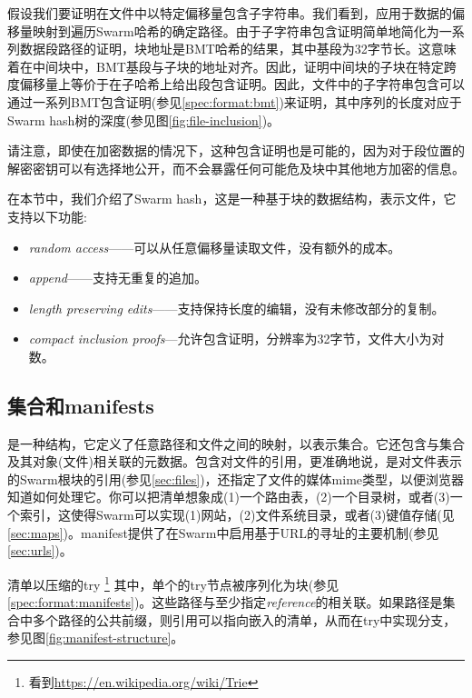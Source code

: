 假设我们要证明在文件中以特定偏移量包含子字符串。我们看到，应用于数据的偏移量映射到遍历Swarm哈希的确定路径。由于子字符串包含证明简单地简化为一系列数据段路径的证明，块地址是BMT哈希的结果，其中基段为32字节长。这意味着在中间块中，BMT基段与子块的地址对齐。因此，证明中间块的子块在特定跨度偏移量上等价于在子哈希上给出段包含证明。因此，文件中的子字符串包含可以通过一系列BMT包含证明(参见\ref{spec:format:bmt})来证明，其中序列的长度对应于Swarm hash树的深度(参见图\ref{fig:file-inclusion})。


请注意，即使在加密数据的情况下，这种包含证明也是可能的，因为对于段位置的解密密钥可以有选择地公开，而不会暴露任何可能危及块中其他地方加密的信息。

在本节中，我们介绍了Swarm hash，这是一种基于块的数据结构，表示文件，它支持以下功能:

\begin{itemize}
    \item \emph{random access}——可以从任意偏移量读取文件，没有额外的成本。
    \item \emph{append}——支持无重复的追加。 
    \item \emph{length preserving edits}——支持保持长度的编辑，没有未修改部分的复制。
    \item \emph{compact inclusion proofs}—允许包含证明，分辨率为32字节，文件大小为对数。
\end{itemize}



\subsection{集合和manifests\statusgreen}\label{sec:collections}

是一种结构，它定义了任意路径和文件之间的映射，以表示集合。它还包含与集合及其对象(文件)相关联的元数据。包含对文件的引用，更准确地说，是对文件表示的Swarm根块的引用(参见\ref{sec:files})，还指定了文件的媒体mime类型，以便浏览器知道如何处理它。你可以把清单想象成(1)一个路由表，(2)一个目录树，或者(3)一个索引，这使得Swarm可以实现(1)网站，(2)文件系统目录，或者(3)键值存储(见\ref{sec:maps})。manifest提供了在Swarm中启用基于URL的寻址的主要机制(参见\ref{sec:urls})。

清单以压缩的try %
%
\footnote{看到\url{https://en.wikipedia.org/wiki/Trie}}
%
其中，单个的try节点被序列化为块(参见\ref{spec:format:manifests})。这些路径与至少指定\emph{reference}的相关联。如果路径是集合中多个路径的公共前缀，则引用可以指向嵌入的清单，从而在try中实现分支，参见图\ref{fig:manifest-structure}。 


